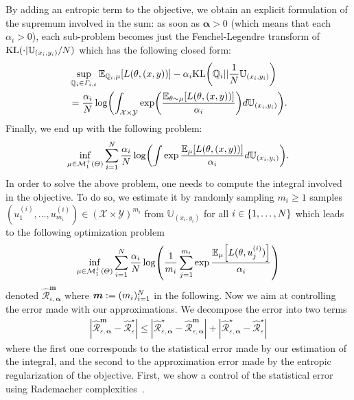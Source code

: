 By adding an entropic term to the objective, we obtain an explicit formulation of the supremum involved in the sum: as soon as $\bm{\alpha}>0$ (which means that each $\alpha_i>0$), each sub-problem becomes just the Fenchel-Legendre transform of $\text{KL}(\cdot|\mathbb{U}_{(x_i,y_i)}/N)$ which has the following closed form:
\begin{align*}
 &\sup_{\QQ_i\in\Gamma_{i,\varepsilon}}\mathbb{E}_{\QQ_i, \mu}\left[\loss(\theta,(x,y))\right]-\alpha_i\text{KL}\left(\QQ_i||\frac{1}{\numsamples}\mathbb{U}_{(x_i,y_i)}\right)\\
 &=\frac{\alpha_i}{\numsamples}\log\left( \int_{\mathcal{X}\times\mathcal{Y}}\exp\left(\frac{\mathbb{E}_{\theta \sim \mu}\left[\loss(\theta,(x,y))\right]}{\alpha_i}\right)d\mathbb{U}_{(x_i,y_i)}\right).
\end{align*}
Finally, we end up with the following problem: 
\begin{align*}
  \inf_{\mu\in \mathcal{M}^+_1(\Theta)}\sum_{i=1}^\numsamples  \frac{\alpha_i}{\numsamples}\log\left( \int\exp\frac{\mathbb{E}_{ \mu}\left[\loss(\theta,(x,y))\right]}{\alpha_i}d\mathbb{U}_{(x_i,y_i)}\right).
\end{align*}
In order to solve the above problem, one needs to compute the integral involved in the objective. To do so, we estimate it by randomly sampling $m_i\geq 1$ samples $(u_1^{(i)},\dots,u_{m_i}^{(i)})\in(\mathcal{X}\times\mathcal{Y})^{m_i}$ from $\mathbb{U}_{(x_i,y_i)}$ for all $i\in\{1,\dots,N\}$ which leads to the following optimization problem
\begin{align}
\label{eq-obj-sample}
  \inf_{\mu\in \mathcal{M}^+_1(\Theta)}\sum_{i=1}^\numsamples  \frac{\alpha_i}{\numsamples}\log\left( \frac{1}{m_i}\sum_{j=1}^{m_i}\exp\frac{\mathbb{E}_{ \mu}\left[\loss(\theta,u_j^{(i)})\right]}{\alpha_i}\right)
\end{align}
denoted $\widehat{\mathcal{R}}_{\varepsilon,\bm{\alpha}}^{\bm{m}}$ where $\bm{m}:=(m_i)_{i=1}^N$ in the following. Now we aim at controlling the error made with our approximations. We decompose the error into two terms
\begin{align*}
  |\widehat{\mathcal{R}}_{\varepsilon,\bm{\alpha}}^{\bm{m}} - \widehat{\mathcal{R}}_{\varepsilon}^{\star}|
   \leq |\widehat{\mathcal{R}}_{\varepsilon,\bm{\alpha}}^{\star} - \widehat{\mathcal{R}}_{\varepsilon,\bm{\alpha}}^{\bm{m}}| +|\widehat{\mathcal{R}}_{\varepsilon,\bm{\alpha}}^{\star} - \widehat{\mathcal{R}}_{\varepsilon}^{\star}|
\end{align*}
where the first one corresponds to the statistical error made by our estimation of the integral, and the second to the approximation error made by the entropic regularization of the objective. First, we show a control of the statistical error using Rademacher complexities~\citep{bartlett2002rademacher}. %
